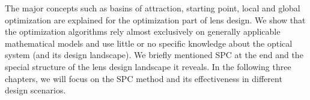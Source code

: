 The major concepts such as basins of attraction, starting point, local and global optimization are explained for the optimization part of lens design. We show that the optimization algorithms rely almost exclusively on generally applicable mathematical models and use little or no specific knowledge about the optical system (and its design landscape). We briefly mentioned SPC at the end and the special structure of the lens design landscape it reveals. In the following three chapters, we will focus on the SPC method and its effectiveness in different design scenarios. 

